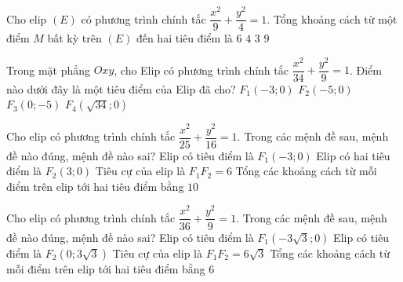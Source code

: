 \begin{ex}%
	Cho elip $(E)$ có phương trình chính tắc $\dfrac{x^2}{9}+\dfrac{y^2}{4}=1$. Tổng khoảng cách từ một điểm $M$ bất kỳ trên $(E)$ đến hai tiêu điểm  là
	\choice 
		 {\True $6$}
		{$4$} 
		 {$3$}
		{$9$} 
\end{ex}

\begin{ex}%
	Trong mặt phẳng $Oxy$, cho Elip có phương trình  chính tắc $\dfrac{x^2}{34}+\dfrac{y^2}{9}=1$. Điểm nào dưới đây là một tiêu điểm của Elip đã cho?
	\choice 
		{$F_1\left(-3;0\right)$} 
		{\True  $F_2\left(-5;0\right)$}
		 {$F_3\left(0;-5\right)$}
		 {$F_4\left(\sqrt{34};0\right)$}
\end{ex}



\begin{ex}%
	Cho elip  có phương trình chính tắc $\dfrac{x^2}{25}+\dfrac{y^2}{16}=1$. Trong các mệnh đề sau, mệnh đề nào đúng, mệnh đề nào sai?
	\choiceTF 
		{\True Elip có tiêu điểm là $F_1(-3;0)$} 
		{\True Elip có hai tiêu điểm là  $F_2(3;0)$}
		{\True Tiêu cự của elip  là $F_1F_2=6$}
		{\True Tổng các khoảng cách từ mỗi điểm trên elip tới hai  tiêu điểm bằng $10$}
\end{ex}

\begin{ex}%
	Cho elip có phương trình chính tắc $\dfrac{x^2}{36}+\dfrac{y^2}{9}=1$. Trong các mệnh đề sau, mệnh đề  nào đúng, mệnh đề nào sai?
	\choiceTF 
		{\True Elip có tiêu  điểm là $F_1(-3\sqrt{3};0)$}
		{Elip có  tiêu điểm là $F_2(0;3\sqrt{3})$}
		{\True Tiêu cự của elip là $F_1F_2=6\sqrt{3}$} 
		 {Tổng các khoảng cách từ mỗi điểm trên elip tới hai tiêu điểm bằng $6$}
\end{ex}

